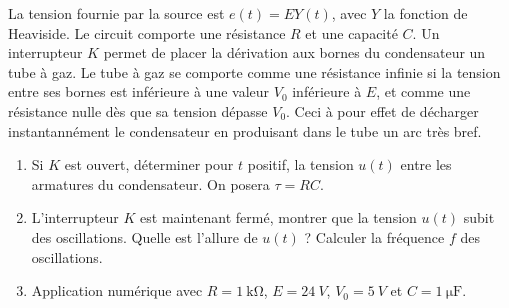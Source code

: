\begin{exercice}
  La tension fournie par la source est \(e(t) = E Y(t)\), avec \(Y\) la fonction de Heaviside. Le circuit comporte une résistance \(R\) et une capacité \(C\). Un interrupteur \(K\) permet de placer la dérivation aux bornes du condensateur un tube à gaz. Le tube à gaz se comporte comme une résistance infinie si la tension entre ses bornes est inférieure à une valeur \(V_0\) inférieure à \(E\), et comme une résistance nulle dès que sa tension dépasse \(V_0\). Ceci à pour effet de décharger instantannément le condensateur en produisant dans le tube un arc très bref.

  \begin{enumerate}
    \item Si \(K\) est ouvert, déterminer pour \(t\) positif, la tension \(u(t)\) entre les armatures du condensateur. On posera \(\tau = RC\).
    \item L'interrupteur \(K\) est maintenant fermé, montrer que la tension \(u(t)\) subit des oscillations. Quelle est l'allure de \(u(t)\) ? Calculer la fréquence \(f\) des oscillations.
    \item Application numérique avec \(R=\SI{1}{\kilo\ohm}\), \(E=\SI{24}{V}\), \(V_0=\SI{5}{V}\) et \(C=\SI{1}{\micro\farad}\).
  \end{enumerate}
\end{exercice}
